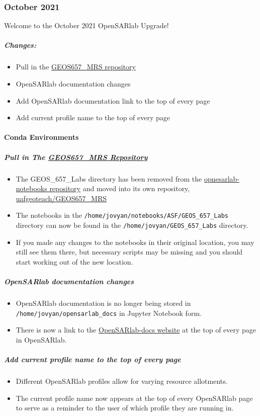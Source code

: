 \subsubsection{October 2021}

Welcome to the October 2021 OpenSARlab Upgrade!

\subparagraph{Changes:}

\begin{itemize}
\item Pull in the \href{https://github.com/uafgeoteach/GEOS657\_MRS}{GEOS657\_MRS repository}
\item OpenSARlab documentation changes
\item Add OpenSARlab documentation link to the top of every page
\item Add current profile name to the top of every page
\end{itemize}

\paragraph{Conda Environments}

\subparagraph{Pull in The \href{https://github.com/uafgeoteach/GEOS657\_MRS}{GEOS657\_MRS Repository}}

\begin{itemize}
\item The GEOS\_657\_Labs directory has been removed from the \href{https://github.com/ASFOpenSARlab/opensarlab-notebooks}{opnesarlab-notebooks repository} and moved into its own repository, \href{https://github.com/uafgeoteach/GEOS657\_MRS}{uafgeoteach/GEOS657\_MRS}
\item The notebooks in the \texttt{/home/jovyan/notebooks/ASF/GEOS\_657\_Labs} directory can now be found in the \texttt{/home/jovyan/GEOS\_657\_Labs} directory.
\item If you made any changes to the notebooks in their original location, you may still see them there, but necessary scripts may be missing and you should start working out of the new location.
\end{itemize}

\subparagraph{OpenSARlab documentation changes}

\begin{itemize}
\item OpenSARlab documentation is no longer being stored in \texttt{/home/jovyan/opensarlab\_docs} in Jupyter Notebook form.
\item There is now a link to the \href{https://opensarlab-docs.asf.alaska.edu/}{OpenSARlab-docs website} at the top of every page in OpenSARlab.
\end{itemize}

\subparagraph{Add current profile name to the top of every page}

\begin{itemize}
\item Different OpenSARlab profiles allow for varying resource allotments.
\item The current profile name now appears at the top of every OpenSARlab page to serve as a reminder to the user of which profile they are running in.
\end{itemize}
